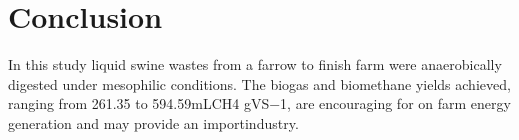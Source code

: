 \section{Conclusion}
In this study liquid swine wastes from a farrow to finish farm were anaerobically digested under mesophilic conditions. The biogas and biomethane yields achieved, ranging from 261.35 to 594.59mLCH4 gVS−1, are encouraging for on farm energy generation and may provide an importindustry.